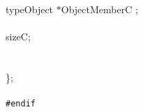 \begin{flushleft}
\mbox{}\\
\hspace*{2\indentation}typeObject $\ast$ObjectMemberC ;\mbox{}\\
\mbox{}\\
\hspace*{2\indentation}{\bf int} sizeC; \mbox{}\\
\hspace*{2\indentation}\mbox{}\\
\mbox{}\\
\};\mbox{}\\
\mbox{}\\
{\tt \#endif} \mbox{}\\
\end{flushleft}
